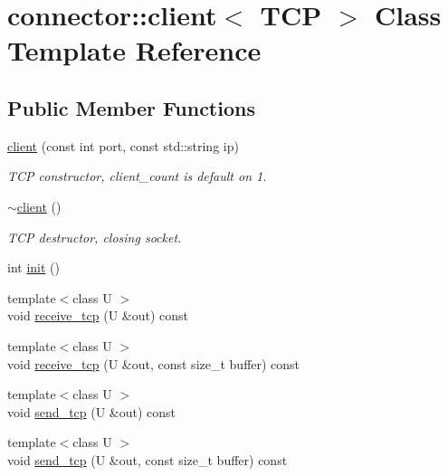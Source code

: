 \hypertarget{classconnector_1_1client_3_01TCP_01_4}{}\section{connector\+:\+:client$<$ T\+CP $>$ Class Template Reference}
\label{classconnector_1_1client_3_01TCP_01_4}
\subsection*{Public Member Functions}
\begin{DoxyCompactItemize}
\item 
\mbox{\label{classconnector_1_1client_3_01TCP_01_4_a7fdbdadfd0754818712f5d3329a17b0d}} 
\hyperlink{classconnector_1_1client_3_01TCP_01_4_a7fdbdadfd0754818712f5d3329a17b0d}{client} (const int port, const std\+::string ip)
\begin{DoxyCompactList}\small\item\em T\+CP constructor, client\+\_\+count is default on 1. \end{DoxyCompactList}\item 
\mbox{\label{classconnector_1_1client_3_01TCP_01_4_a8ff3e6f6cf840fa0160565c7880e6ef8}} 
\hyperlink{classconnector_1_1client_3_01TCP_01_4_a8ff3e6f6cf840fa0160565c7880e6ef8}{$\sim$client} ()
\begin{DoxyCompactList}\small\item\em T\+CP destructor, closing socket. \end{DoxyCompactList}\item 
int \hyperlink{classconnector_1_1client_3_01TCP_01_4_a9bca6347bbf5732e8974e69dc16d60e4}{init} ()
\item 
{\footnotesize template$<$class U $>$ }\\void \hyperlink{classconnector_1_1client_3_01TCP_01_4_aede666f3c255ad8821cb1c844702f046}{receive\+\_\+tcp} (U \&out) const
\item 
{\footnotesize template$<$class U $>$ }\\void \hyperlink{classconnector_1_1client_3_01TCP_01_4_a1b2a674bf93a7e1533016c2f8393d64c}{receive\+\_\+tcp} (U \&out, const size\+\_\+t buffer) const
\item 
{\footnotesize template$<$class U $>$ }\\void \hyperlink{classconnector_1_1client_3_01TCP_01_4_a71e97892c7765d1a156a364925ee1ca2}{send\+\_\+tcp} (U \&out) const
\item 
{\footnotesize template$<$class U $>$ }\\void \hyperlink{classconnector_1_1client_3_01TCP_01_4_ab61e009d01af8a21d138750ef0fceb47}{send\+\_\+tcp} (U \&out, const size\+\_\+t buffer) const
\end{DoxyCompactItemize}
